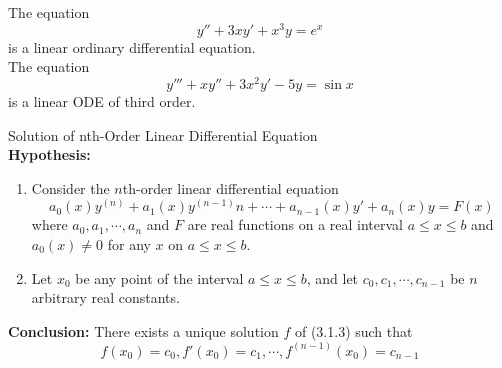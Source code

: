 \begin{example}{}{}
    The equation \[
        y'' + 3xy' + x^3y = e^x
    \] is a linear ordinary differential equation.\\
    The equation \[
        y''' + xy'' + 3x^2y' - 5y = \sin x
    \] is a linear ODE of third order.
\end{example}

\begin{theorem}{Solution of nth-Order Linear Differential Equation}{}
    \\\textbf{Hypothesis:}
    \begin{enumerate}
        \item Consider the $n$th-order linear differential equation
            \begin{equation}
                a_0(x)y^{(n)} + a_1(x)y^{(n-1)}n + \cdots + a_{n-1}(x)y' + a_n(x)y = F(x)
            \end{equation}
        where $a_0, a_1, \cdots, a_n$ and $F$ are real functions on a real interval $a \le x \le b$ and $a_0(x) \neq 0$ for any  $x$ on $a \le x \le b$.
        \item Let $x_0$ be any point of the interval $a \le x \le b$, and let $c_0, c_1, \cdots, c_{n-1}$ be $n$ arbitrary real constants.
    \end{enumerate}
    \textbf{Conclusion:} There exists a unique solution $f$ of (3.1.3) such that
    \begin{equation}
        f(x_0) = c_0, f'(x_0) = c_1, \cdots, f^{(n-1)}(x_0) = c_{n-1}
    \end{equation}
\end{theorem}































